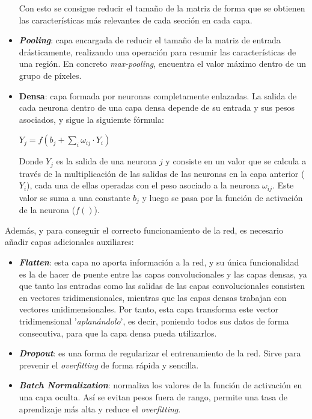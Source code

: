 \documentclass{uc3mpracticas}
\begin{document}
\begin{itemize}
    \vspace{2mm}

    Con esto se consigue reducir el tamaño de la matriz de forma que se obtienen las características más relevantes de cada sección en cada capa.


    \item \textbf{\textit{Pooling}}: capa encargada de reducir el tamaño de la matriz de entrada drásticamente, realizando una operación para resumir las características de una región. En concreto \textit{max-pooling}, encuentra el valor máximo dentro de un grupo de píxeles.

    \item \textbf{Densa}: capa formada por neuronas completamente enlazadas. La salida de cada neurona dentro de una capa densa depende de su entrada y sus pesos asociados, y sigue la siguiemte fórmula:

    \begin{center}
      $ \displaystyle Y_{j}=f\left(b_{j}+\sum_{i}\omega_{ij} \cdot Y_{i}\right)$
    \end{center}


    Donde $\displaystyle Y_{j}$ es la salida de una neurona $\displaystyle j$ y consiste en un valor que se calcula a través de la multiplicación de las salidas de las neuronas en la capa anterior ($\displaystyle Y_{i}$), cada una de ellas operadas con el peso asociado a la neurona $\omega_{ij}$. Este valor se suma a una constante $\displaystyle b_{j}$ y luego se pasa por la función de activación de la neurona ($\displaystyle f()$).

  \end{itemize}

  Además, y para conseguir el correcto funcionamiento de la red, es necesario añadir capas adicionales auxiliares:

  \begin{itemize}
    \item \textbf{\textit{Flatten}}: esta capa no aporta información a la red, y su única funcionalidad es la de hacer de puente entre las capas convolucionales y las capas densas, ya que tanto las entradas como las salidas de las capas convolucionales consisten en vectores tridimensionales, mientras que las capas densas trabajan con vectores unidimensionales. Por tanto, esta capa transforma este vector tridimensional '\textit{aplanándolo}', es decir, poniendo todos sus datos de forma consecutiva, para que la capa densa pueda utilizarlos.

    \item \textbf{\textit{Dropout}}: es una forma de regularizar el entrenamiento de la red. Sirve para prevenir el \textit{overfitting} de forma rápida y sencilla.

    \item \textbf{\textit{Batch Normalization}}: normaliza los valores de la función de activación en una capa oculta. Así se evitan pesos fuera de rango, permite una tasa de aprendizaje más alta y reduce el \textit{overfitting}.

  \end{itemize}
\end{document}
